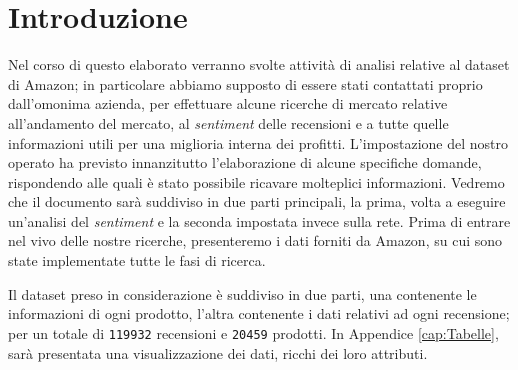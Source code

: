 \chapter*{Introduzione}
	Nel corso di questo elaborato verranno svolte attività di analisi relative al dataset di Amazon; in particolare abbiamo supposto di essere stati contattati proprio dall'omonima azienda, per effettuare alcune ricerche di mercato relative all'andamento del mercato, al \textit{sentiment} delle recensioni e a tutte quelle informazioni utili per una miglioria interna dei profitti. L'impostazione del nostro operato ha previsto innanzitutto l'elaborazione di alcune specifiche domande, rispondendo alle quali è stato possibile ricavare molteplici informazioni. Vedremo che il documento sarà suddiviso in due parti principali, la prima, volta a eseguire un'analisi del \textit{sentiment} e la seconda impostata invece sulla rete. Prima di entrare nel vivo delle nostre ricerche, presenteremo i dati forniti da Amazon, su cui sono state implementate tutte le fasi di ricerca.

	Il dataset preso in considerazione è suddiviso in due parti, una contenente le informazioni di ogni prodotto, l’altra contenente i dati relativi ad ogni recensione; per un totale di \verb|119932| recensioni e \verb|20459| prodotti. In Appendice \ref{cap:Tabelle}, sarà presentata una visualizzazione dei dati, ricchi dei loro attributi.
	